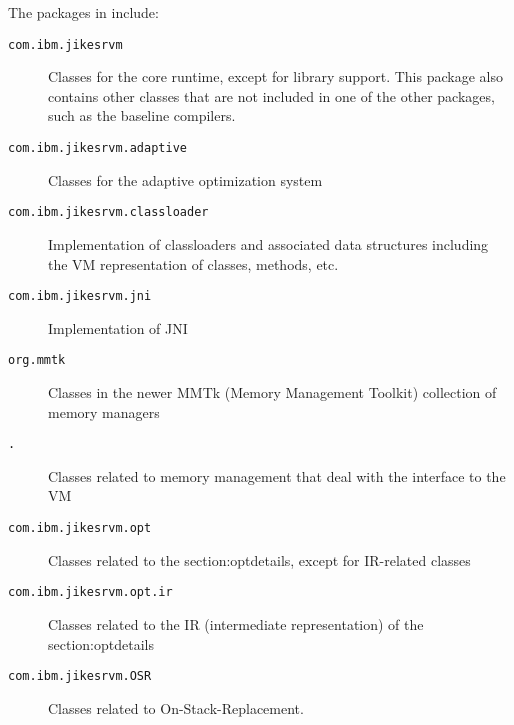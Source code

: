 The packages in \jrvm{} include:
\begin{description}
\item[\texttt{com.ibm.jikesrvm}] Classes for the core runtime, except for library
support.  This package also contains other classes that are not
included in one of the other packages, such as the baseline compilers. 

\item[\texttt{com.ibm.jikesrvm.adaptive}] Classes for the adaptive optimization system

\item[\texttt{com.ibm.jikesrvm.classloader}] Implementation of classloaders
and associated data structures including the VM representation of classes,
methods, etc. 

\item[\texttt{com.ibm.jikesrvm.jni}] Implementation of JNI

\item[\texttt{org.mmtk}] Classes in the newer MMTk
(Memory Management Toolkit) collection of memory managers

\item[\texttt{\MMpackage\-.\mmInterface{}}] Classes related to
memory management that deal with the interface to the VM

\item[\texttt{com.ibm.jikesrvm.opt}] Classes related to
the %
{section:optdetails}, except for IR-related classes

\item[\texttt{com.ibm.jikesrvm.opt.ir}] Classes related to the IR
(intermediate representation) of the %
{section:optdetails}

\item[\texttt{com.ibm.jikesrvm.OSR}] Classes related to On-Stack-Replacement. 


\end{description}
